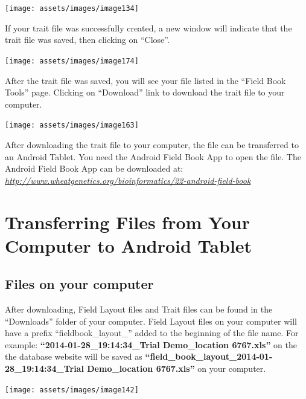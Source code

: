 \documentclass[
  12pt,
]{book}
\begin{document}
\begin{center}\texttt{[image: assets/images/image134]} \end{center}

If your trait file was successfully created, a new window will indicate that the trait file was saved, then clicking on ``Close''.

\begin{center}\texttt{[image: assets/images/image174]} \end{center}

After the trait file was saved, you will see your file listed in the ``Field Book Tools'' page. Clicking on ``Download'' link to download the trait file to your computer.

\begin{center}\texttt{[image: assets/images/image163]} \end{center}

After downloading the trait file to your computer, the file can be transferred to an Android Tablet. You need the Android Field Book App to open the file. The Android Field Book App can be downloaded at: \emph{\url{http://www.wheatgenetics.org/bioinformatics/22-android-field-book}}

\hypertarget{transferring-files-from-your-computer-to-android-tablet}{%
\section{Transferring Files from Your Computer to Android Tablet}\label{transferring-files-from-your-computer-to-android-tablet}}

\hypertarget{files-on-your-computer}{%
\subsection{Files on your computer}\label{files-on-your-computer}}

After downloading, Field Layout files and Trait files can be found in the ``Downloads'' folder of your computer. Field Layout files on your computer will have a prefix ``fieldbook\_layout\_'' added to the beginning of the file name. For example: \textbf{``2014-01-28\_19:14:34\_Trial Demo\_location 6767.xls''} on the the database website will be saved as \textbf{``field\_book\_layout\_2014-01-28\_19:14:34\_Trial Demo\_location 6767.xls''} on your computer.

\begin{center}\texttt{[image: assets/images/image142]} \end{center}
\end{document}
